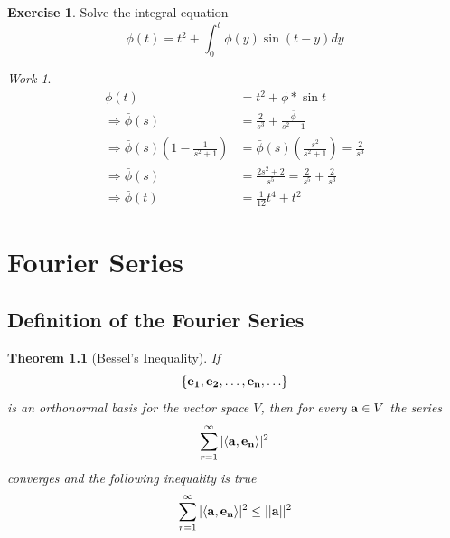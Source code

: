 \documentclass{report}
\newtheorem{theorem}{Theorem}[chapter]
\theoremstyle{definition}
\newtheorem{exercise}{Exercise}[chapter]
\theoremstyle{remark}
\newtheorem*{work}{Work}
\begin{document}
\begin{exercise}
    Solve the integral equation 
    \begin{equation*}
        \phi(t) = t^2 + \int^t_0\phi (y)\sin (t-y)dy
    \end{equation*}
\end{exercise}
\begin{work}
    \begin{equation*}
        \begin{split}
            \phi(t) &= t^2+\phi*\sin t \\
            \Rightarrow \bar \phi(s) &=\frac{2}{s^3}+\frac{\bar \phi}{s^2+1} \\
            \Rightarrow \bar \phi(s)\left(1-\frac{1}{s^2+1} \right)&= \bar \phi(s)\left( \frac{s^2}{s^2+1}\right)=\frac{2}{s^3}\\
            \Rightarrow \bar \phi(s) &= \frac{2s^2+2}{s^5}= \frac{2}{s^5}+\frac{2}{s^3}\\
            \Rightarrow \bar \phi(t)&= \frac{1}{12}t^4+t^2
        \end{split}
    \end{equation*}
\end{work}


\chapter{Fourier Series}
\section{Definition of the Fourier Series}
\begin{theorem} [Bessel's Inequality]
    If 
    \begin{equation*}
        \{\bold{e_1,e_2,\ldots,e_n,\dots}\} 
    \end{equation*}
    is an orthonormal basis for the vector space $V$, then for every $\bold{a} \in V$ the series 
    \begin{equation*}
        \sum^\infty_{r=1}|\langle \bold{a,e_n} \rangle|^2
    \end{equation*}
    converges and the following inequality is true
    \begin{equation*}
        \sum^\infty_{r=1}|\langle \bold{a,e_n}\rangle|^2 \leq ||\bold{a}||^2
    \end{equation*}
\end{theorem}
\end{document}
